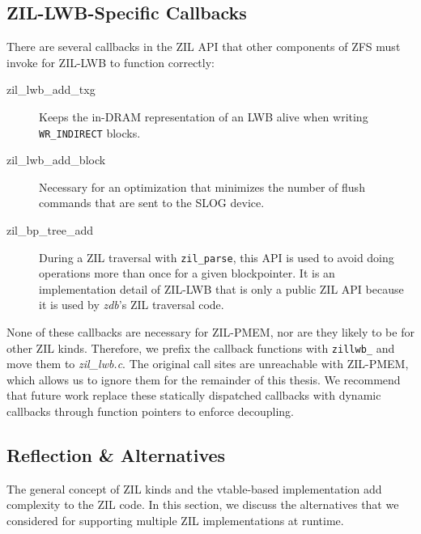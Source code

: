 \documentclass[12pt,a4paper,twoside]{book}
\begin{document}
{\subsection{ZIL-LWB-Specific Callbacks}\label{sec:zil_kinds:callbacks}
There are several callbacks in the ZIL API that other components of ZFS must invoke for ZIL-LWB to function correctly:
\begin{description}
    \item[zil\_lwb\_add\_txg] Keeps the in-DRAM representation of an LWB alive when writing \lstinline{WR_INDIRECT} blocks.
    \item[zil\_lwb\_add\_block] Necessary for an optimization that minimizes the number of flush commands that are sent to the SLOG device.
    \item[zil\_bp\_tree\_add] During a ZIL traversal with \lstinline{zil_parse}, this API is used to avoid doing operations more than once for a given blockpointer.
    It is an implementation detail of ZIL-LWB that is only a public ZIL API because it is used by \textit{zdb}'s ZIL traversal code.
\end{description}
None of these callbacks are necessary for ZIL-PMEM, nor are they likely to be for other ZIL kinds.
Therefore, we prefix the callback functions with \lstinline{zillwb_} and move them to \textit{zil\_lwb.c}.
The original call sites are unreachable with ZIL-PMEM, which allows us to ignore them for the remainder of this thesis.
We recommend that future work replace these statically dispatched callbacks with dynamic callbacks through function pointers to enforce decoupling.

\subsection{Reflection \& Alternatives}\label{sec:zil_kinds:alternatives}
The general concept of ZIL kinds and the vtable-based implementation add complexity to the ZIL code.
In this section, we discuss the alternatives that we considered for supporting multiple ZIL implementations at runtime.

}
\end{document}
